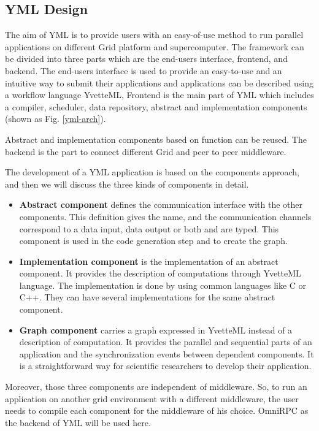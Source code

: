\subsection{YML Design}

The aim of YML is to provide users with an easy-of-use method to run parallel applications on different Grid platform and supercomputer. The framework can be divided into three parts which are the end-users interface, frontend, and backend. The end-users interface is used to provide an easy-to-use and an intuitive way to submit their applications and applications can be described using a workflow language YvetteML, Frontend is the main part of YML which includes a compiler, scheduler, data repository, abstract and implementation components (shown as Fig. \ref{yml-arch}).

Abstract and implementation components based on function can be reused. The backend is the part to connect different Grid and peer to peer middleware.

The development of a YML application is based on the components approach, and then we will discuss the three kinds of components in detail.

\begin{itemize}
	\item \textbf{Abstract component} defines the communication interface with the other components. This definition gives the name, and the communication channels correspond to a data input, data output or both and are typed. This component is used in the code generation step and to create the graph.
	
	\item \textbf{Implementation component} is the implementation of an abstract component. It provides the description of computations through YvetteML language. The implementation is done by using common languages like C or C++. They can have several implementations for the same abstract component.
	
	\item \textbf{Graph component} carries a graph expressed in YvetteML instead of a description of computation. It provides the parallel and sequential parts of an application and the synchronization events between dependent components. It is a straightforward way for scientific researchers to develop their application.
\end{itemize}

Moreover, those three components are independent of middleware. So, to run an application on another grid environment with a different middleware, the user needs to compile each component for the middleware of his choice. OmniRPC as the backend of YML will be used here.

